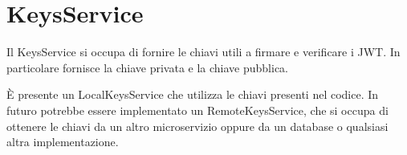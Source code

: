 \section{KeysService}

Il KeysService si occupa di fornire le chiavi utili a firmare e verificare i JWT. In particolare fornisce la chiave privata e la chiave pubblica.

È presente un LocalKeysService che utilizza le chiavi presenti nel codice. In futuro potrebbe essere implementato un RemoteKeysService, che si occupa di ottenere le chiavi da un altro microservizio oppure da un database o qualsiasi altra implementazione.
